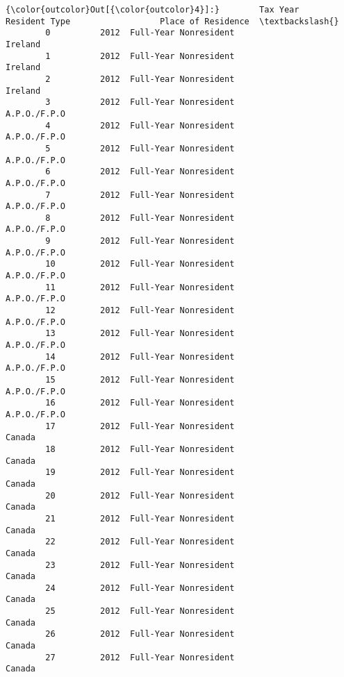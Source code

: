 \documentclass[11pt]{article}
\begin{document}
\begin{Verbatim}[commandchars=\\\{\}]
{\color{outcolor}Out[{\color{outcolor}4}]:}        Tax Year          Resident Type                  Place of Residence  \textbackslash{}
        0          2012  Full-Year Nonresident                             Ireland   
        1          2012  Full-Year Nonresident                             Ireland   
        2          2012  Full-Year Nonresident                             Ireland   
        3          2012  Full-Year Nonresident                        A.P.O./F.P.O   
        4          2012  Full-Year Nonresident                        A.P.O./F.P.O   
        5          2012  Full-Year Nonresident                        A.P.O./F.P.O   
        6          2012  Full-Year Nonresident                        A.P.O./F.P.O   
        7          2012  Full-Year Nonresident                        A.P.O./F.P.O   
        8          2012  Full-Year Nonresident                        A.P.O./F.P.O   
        9          2012  Full-Year Nonresident                        A.P.O./F.P.O   
        10         2012  Full-Year Nonresident                        A.P.O./F.P.O   
        11         2012  Full-Year Nonresident                        A.P.O./F.P.O   
        12         2012  Full-Year Nonresident                        A.P.O./F.P.O   
        13         2012  Full-Year Nonresident                        A.P.O./F.P.O   
        14         2012  Full-Year Nonresident                        A.P.O./F.P.O   
        15         2012  Full-Year Nonresident                        A.P.O./F.P.O   
        16         2012  Full-Year Nonresident                        A.P.O./F.P.O   
        17         2012  Full-Year Nonresident                              Canada   
        18         2012  Full-Year Nonresident                              Canada   
        19         2012  Full-Year Nonresident                              Canada   
        20         2012  Full-Year Nonresident                              Canada   
        21         2012  Full-Year Nonresident                              Canada   
        22         2012  Full-Year Nonresident                              Canada   
        23         2012  Full-Year Nonresident                              Canada   
        24         2012  Full-Year Nonresident                              Canada   
        25         2012  Full-Year Nonresident                              Canada   
        26         2012  Full-Year Nonresident                              Canada   
        27         2012  Full-Year Nonresident                              Canada   

\end{Verbatim}
\end{document}
